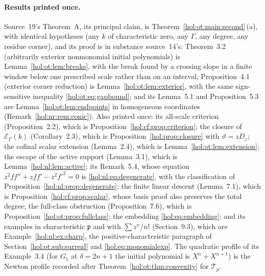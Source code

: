 \documentclass[11pt]{article}
\numberwithin{equation}{section}
\theoremstyle{definition}
\theoremstyle{remark}
\newcommand{\EK}{\mathcal E_\Gamma(k)}
\begin{document}
\paragraph{Results printed once.}
Source~19's Theorem~A, its principal claim, is
Theorem~\ref{hol:ot:main:second}\,(a), with identical hypotheses (any $k$ of
characteristic zero, any $\Gamma$, any degree, any residue corner), and its
proof is in substance source~14's: Theorem~3.2 (arbitrarily exterior
nonmonomial initial polynomials) is Lemma~\ref{hol:ot:lem:breaks}, with the
break found by a crossing slope in a finite window below one prescribed scale
rather than on an interval; Proposition~4.1 (exterior corner reduction) is
Lemma~\ref{hol:ot:lem:exterior}, with the same sign-sensitive inequality
\eqref{hol:ot:eq:gapbound}; and its Lemma~5.1 and Proposition~5.3 are
Lemma~\ref{hol:ot:lem:endpoints} in homogeneous coordinates
(Remark~\ref{hol:nr:rem:conic}). Also printed once: its all-scale criterion
(Proposition~2.2), which is Proposition~\ref{hol:cf:prop:criterion}; the closure
of $\EK$ (Corollary~2.3), which is Proposition~\ref{hol:prop:closure} with
$\vartheta=zD_z$; the cofinal scalar extension (Lemma~2.4), which is
Lemma~\ref{hol:ot:lem:extension}; the escape of the active support
(Lemma~3.1), which is Lemma~\ref{hol:nl:lem:active}; its Remark~5.4, whose
equation $z^2ff''+zff'-z^2f'^2=0$ is \eqref{hol:nl:eq:degenerate}, with the
classification of Proposition~\ref{hol:nl:prop:degenerate}; the finite linear
descent (Lemma~7.1), which is Proposition~\ref{hol:cf:prop:scalar}, whose
basis proof also preserves the total degree; the full-class obstruction
(Proposition~7.6), which is Proposition~\ref{hol:ot:prop:fullclass}; the
embedding \eqref{hol:eq:embedding}; and its examples in characteristic
$\mathfrak p$ and with $\sum z^n/n!$ (Section~9.3), which are
Example~\ref{hol:nl:ex:charp}, the positive-characteristic paragraph of
Section~\ref{hol:ot:sub:surreal} and \eqref{hol:eq:monomialexp}. The quadratic
profile of its Example~3.4 (for $G_1$ at $\delta=2n+1$ the initial polynomial
is $X^n+X^{n+1}$) is the Newton profile recorded after
Theorem~\ref{hol:ot:thm:convexity} for $\mathcal T_p$.
\end{document}

